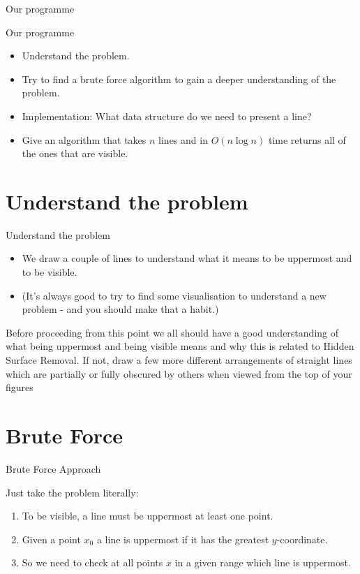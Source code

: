 \documentclass[ignorenonframetext,]{beamer}
\providecommand{\tightlist}{%
  \setlength{\itemsep}{0pt}\setlength{\parskip}{0pt}}
\begin{document}
\begin{frame}{Our programme}

\begin{block}{Our programme}

\begin{itemize}[<+->]
\tightlist
\item
  Understand the problem.
\item
  Try to find a brute force algorithm to gain a deeper understanding of the problem.
 \item
  Implementation: What data structure do we need to present a line?
\item
  Give an algorithm that takes \(n\) lines and in \(O(n\log n)\) time
  returns all of the ones that are visible.
\end{itemize}

\end{block}

\end{frame}

\section{Understand the problem}

\begin{frame}{Understand the problem}

\begin{itemize}
    \item We draw a couple of lines to understand what it means to be uppermost and to be visible. 
    \item (It's always good to try to find some visualisation to understand a new problem - and you should make that a habit.)
\end{itemize}
    
Before proceeding from this point we all should have a good understanding of what being uppermost and being visible means and why this is related to Hidden Surface Removal. If not, draw a few more different arrangements of straight lines which are partially or fully obscured by others when viewed from the top of your figures
\end{frame}

\section{Brute Force}

\begin{frame}{Brute Force Approach}

  Just take the problem literally:
  \begin{enumerate}
  \item To be visible, a line must be uppermost at least one point.
  \item Given a point $x_0$ a line is uppermost if it has the greatest $y$-coordinate.
  \item So we need to check at all points $x$ in a given range which line is uppermost.
  \end{enumerate}
\end{frame}
\end{document}
